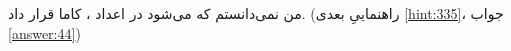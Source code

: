 \section{}
\paragraph{}\label{hint:55}
من نمی‌دانستم که می‌شود در اعداد ، کاما قرار داد. (راهنماییِ بعدی \ref{hint:335}، جواب \ref{answer:44})